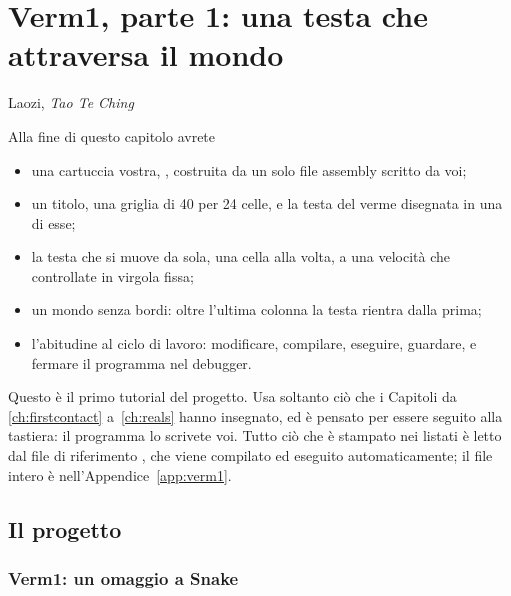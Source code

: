 \chapter{Verm1, parte 1: una testa che attraversa il mondo}
\label{ch:verm1p1}

  {Laozi, \emph{Tao Te Ching}}

\begin{chapgoals}
Alla fine di questo capitolo avrete
\begin{itemize}
\item una cartuccia vostra, , costruita da un solo file
  assembly scritto da voi;
\item un titolo, una griglia di 40 per 24 celle, e la testa del verme disegnata in una di esse;
\item la testa che si muove da sola, una cella alla volta, a una velocità che controllate in virgola fissa;
\item un mondo senza bordi: oltre l'ultima colonna la testa rientra dalla prima;
\item l'abitudine al ciclo di lavoro: modificare, compilare, eseguire,
  guardare, e fermare il programma nel debugger.
\end{itemize}
\end{chapgoals}


Questo è il primo tutorial del progetto. Usa soltanto ciò che i Capitoli da
\ref{ch:firstcontact} a~\ref{ch:reals} hanno insegnato, ed è pensato per essere
seguito alla tastiera: il programma lo scrivete voi. Tutto ciò che è stampato
nei listati è letto dal file di riferimento , che viene
compilato ed eseguito automaticamente; il file intero è
nell'Appendice~\ref{app:verm1}.

\section{Il progetto}

\subsection{Verm1: un omaggio a Snake}

